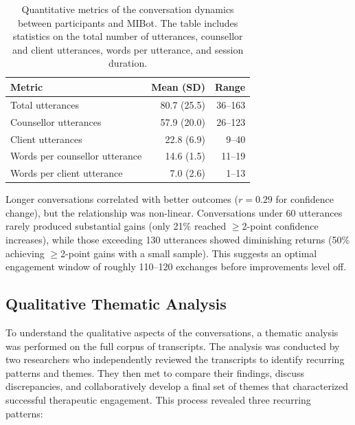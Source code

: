 \begin{table}[ht]
\centering
\small
\setlength{\tabcolsep}{4pt}
\renewcommand{\arraystretch}{1.2}
\begin{tabular}{@{}lrr@{}}
\toprule
\textbf{Metric} & \textbf{Mean (SD)} & \textbf{Range} \\
\midrule
Total utterances               & 80.7 (25.5) & 36--163 \\
Counsellor utterances          & 57.9 (20.0) & 26--123 \\
Client utterances              & 22.8 (6.9)  & 9--40 \\
Words per counsellor utterance & 14.6 (1.5)  & 11--19 \\
Words per client utterance     & 7.0 (2.6)   & 1--13 \\
\bottomrule
\end{tabular}
	\caption[Conversation Dynamics between Participants and MIBot: Quantitative Metrics]{Quantitative metrics of the conversation dynamics between participants and MIBot. The table includes statistics on the total number of utterances, counsellor and client utterances, words per utterance, and session duration.}
	\label{table:conversation-dynamics}
\end{table}

Longer conversations correlated with better outcomes ($r = 0.29$ for confidence change), but the relationship was non-linear. Conversations under 60 utterances rarely produced substantial gains (only 21\% reached $\geq$2-point confidence increases), while those exceeding 130 utterances showed diminishing returns (50\% achieving $\geq$2-point gains with a small sample). This suggests an optimal engagement window of roughly 110--120 exchanges before improvements level off.


\subsection*{Qualitative Thematic Analysis}

To understand the qualitative aspects of the conversations, a thematic analysis was performed on the full corpus of transcripts. The analysis was conducted by two researchers who independently reviewed the transcripts to identify recurring patterns and themes. They then met to compare their findings, discuss discrepancies, and collaboratively develop a final set of themes that characterized successful therapeutic engagement. This process revealed three recurring patterns:




